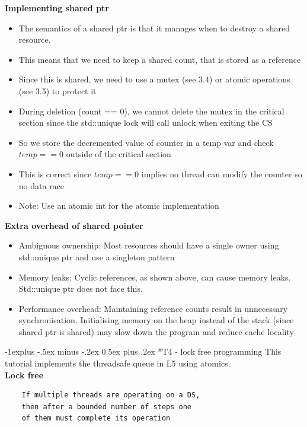 \documentclass[10pt, landscape]{article}
\makeatletter
\renewcommand{\subsection}{\@startsection{subsection}{2}{0mm}%
                                {-1explus -.5ex minus -.2ex}%
                                {0.5ex plus .2ex}%
                                {\normalfont\normalsize\bfseries}}
\makeatother
\begin{document}
\begin{multicols}{4}
\textbf{Implementing shared ptr} \\
\begin{itemize}
    \item The semantics of a shared ptr is that it manages when to destroy a shared resource.
    \item This means that we need to keep a shared count, that is stored as a reference
    \item Since this is shared, we need to use a mutex (see 3.4) or atomic operations (see 3.5) to protect it
    \item During deletion (count == 0), we cannot delete the mutex in the critical section since the std::unique lock will call unlock when exiting the CS
    \item So we store the decremented value of counter in a temp var and check $temp==0$ outside of the critical section
    \item This is correct since $temp==0$ implies no thread can modify the counter so no data race
    \item Note: Use an atomic int for the atomic implementation
\end{itemize}

\textbf{Extra overhead of shared pointer} \\
\begin{itemize}
    \item Ambiguous ownership: Most resources should have a single owner using std::unique ptr and use a singleton pattern
    \item Memory leaks: Cyclic references, as shown above, can cause memory leaks. Std::unique ptr does not face this. 
    \item Performance overhead: Maintaining reference counts result in unnecessary synchronisation. Initialising memory on the heap instead of the stack (since shared ptr is shared) may slow down the program and reduce cache locality
\end{itemize}

\subsection*{T4 - lock free programming} 
This tutorial implements the threadsafe queue in L5 using atomics.\\

\textbf{Lock free} \\
\begin{verbatim}
    If multiple threads are operating on a DS, 
    then after a bounded number of steps one 
    of them must complete its operation
\end{verbatim}


\end{multicols}
\end{document}
